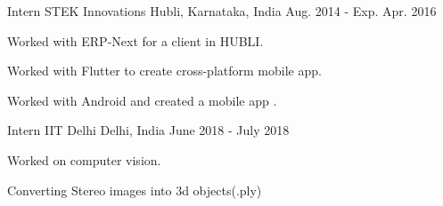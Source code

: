 


\begin{cventries}


\cventry
{Intern} %
{STEK Innovations} %
{Hubli, Karnataka, India} %
{Aug. 2014 - Exp. Apr. 2016} %
{ %
\begin{cvitems}
\item {Worked with ERP-Next for a client in HUBLI.}
\item {Worked with Flutter to create cross-platform mobile app.}
\item {Worked with Android and created a mobile app .}
\end{cvitems}
}
\cventry
{Intern} %
{IIT Delhi} %
{Delhi, India} %
{June 2018 - July 2018} %
{ %
\begin{cvitems}
\item {Worked on computer vision.}
\item {Converting Stereo images into 3d objects(.ply)}
\end{cvitems}
}





\end{cventries}